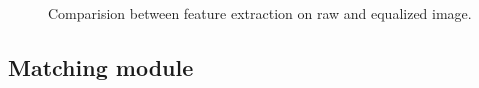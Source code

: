 \begin{figure}[H]
		
\centering

\\
\caption{Comparision between feature extraction on raw and equalized image.}
\label{experiTrack4}
\end{figure}


\subsection{Matching module}


